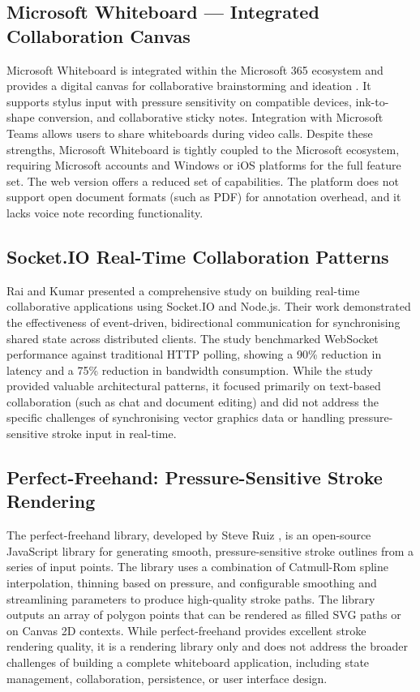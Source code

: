 \documentclass[12pt,a4paper]{report}
\begin{document}
\subsection{Microsoft Whiteboard — Integrated Collaboration Canvas}

Microsoft Whiteboard is integrated within the Microsoft 365 ecosystem and provides a digital canvas for collaborative brainstorming and ideation \cite{ref5}. It supports stylus input with pressure sensitivity on compatible devices, ink-to-shape conversion, and collaborative sticky notes. Integration with Microsoft Teams allows users to share whiteboards during video calls. Despite these strengths, Microsoft Whiteboard is tightly coupled to the Microsoft ecosystem, requiring Microsoft accounts and Windows or iOS platforms for the full feature set. The web version offers a reduced set of capabilities. The platform does not support open document formats (such as PDF) for annotation overhead, and it lacks voice note recording functionality.

\subsection{Socket.IO Real-Time Collaboration Patterns}

Rai and Kumar \cite{ref6} presented a comprehensive study on building real-time collaborative applications using Socket.IO and Node.js. Their work demonstrated the effectiveness of event-driven, bidirectional communication for synchronising shared state across distributed clients. The study benchmarked WebSocket performance against traditional HTTP polling, showing a 90\% reduction in latency and a 75\% reduction in bandwidth consumption. While the study provided valuable architectural patterns, it focused primarily on text-based collaboration (such as chat and document editing) and did not address the specific challenges of synchronising vector graphics data or handling pressure-sensitive stroke input in real-time.

\subsection{Perfect-Freehand: Pressure-Sensitive Stroke Rendering}

The perfect-freehand library, developed by Steve Ruiz \cite{ref7}, is an open-source JavaScript library for generating smooth, pressure-sensitive stroke outlines from a series of input points. The library uses a combination of Catmull-Rom spline interpolation, thinning based on pressure, and configurable smoothing and streamlining parameters to produce high-quality stroke paths. The library outputs an array of polygon points that can be rendered as filled SVG paths or on Canvas 2D contexts. While perfect-freehand provides excellent stroke rendering quality, it is a rendering library only and does not address the broader challenges of building a complete whiteboard application, including state management, collaboration, persistence, or user interface design.
\end{document}
